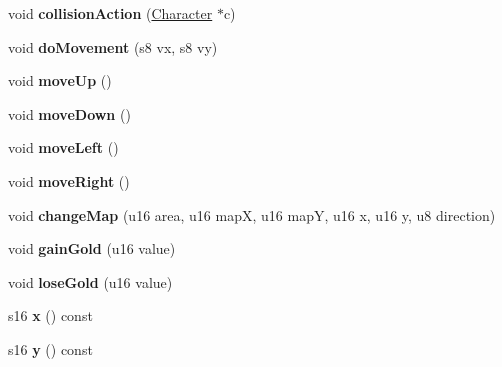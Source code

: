 \begin{DoxyCompactItemize}
\item 
\hypertarget{classCharacter_ae1e72736b8e8c3f802957e1acfa7ad34}{void {\bfseries collision\-Action} (\hyperlink{classCharacter}{Character} $\ast$c)}\label{classCharacter_ae1e72736b8e8c3f802957e1acfa7ad34}

\item 
\hypertarget{classCharacter_ad967ce11157d1835be0e19873648feeb}{void {\bfseries do\-Movement} (s8 vx, s8 vy)}\label{classCharacter_ad967ce11157d1835be0e19873648feeb}

\item 
\hypertarget{classCharacter_a5e63747ea61305391cd0ada0898e485c}{void {\bfseries move\-Up} ()}\label{classCharacter_a5e63747ea61305391cd0ada0898e485c}

\item 
\hypertarget{classCharacter_afa7763e81bca6a0b9b0c044f39c429f0}{void {\bfseries move\-Down} ()}\label{classCharacter_afa7763e81bca6a0b9b0c044f39c429f0}

\item 
\hypertarget{classCharacter_a88dfc867ab226d3f115b891fc3b34d67}{void {\bfseries move\-Left} ()}\label{classCharacter_a88dfc867ab226d3f115b891fc3b34d67}

\item 
\hypertarget{classCharacter_a0a8bf66e3d70c196a0fa8ce183f4aeb4}{void {\bfseries move\-Right} ()}\label{classCharacter_a0a8bf66e3d70c196a0fa8ce183f4aeb4}

\item 
\hypertarget{classCharacter_a5c474be3ae9a12b416cde56131d6e442}{void {\bfseries change\-Map} (u16 area, u16 map\-X, u16 map\-Y, u16 x, u16 y, u8 direction)}\label{classCharacter_a5c474be3ae9a12b416cde56131d6e442}

\item 
\hypertarget{classCharacter_aaf4ad54e5a10bcbae24c64664e873477}{void {\bfseries gain\-Gold} (u16 value)}\label{classCharacter_aaf4ad54e5a10bcbae24c64664e873477}

\item 
\hypertarget{classCharacter_af7d367c2d38c0c9ee6f821350e7afd4c}{void {\bfseries lose\-Gold} (u16 value)}\label{classCharacter_af7d367c2d38c0c9ee6f821350e7afd4c}

\item 
\hypertarget{classCharacter_a5dbb3462c702f6a9868dece29d45577e}{s16 {\bfseries x} () const }\label{classCharacter_a5dbb3462c702f6a9868dece29d45577e}

\item 
\hypertarget{classCharacter_a08197f0e29e3f9205bb2d222892ace20}{s16 {\bfseries y} () const }\label{classCharacter_a08197f0e29e3f9205bb2d222892ace20}


\end{DoxyCompactItemize}
